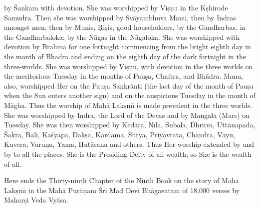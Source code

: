 by \'Sankara with devotion. She was worshipped by Vi\d{s}\d{n}u in the K\d{s}hirode Samudra. Then she was worshipped by Sv\=ayambhuva Manu, then by Indras amongst men, then by Munis, \d{R}i\d{s}is, good householders, by the Gandharbas, in the Gandharbaloka; by the N\=agas in the N\=agaloka. She was worshipped with devotion by Brahm\=a for one fortnight commencing from the bright eighth day in the month of Bh\=adra and ending on the eighth day of the dark fortnight in the three-worlds. She was worshipped by Vi\d{s}\d{n}u, with devotion in the three worlds on the meritorious Tuesday in the months of Pau\d{s}a, Chaitra, and Bh\=adra. Manu, also, worshipped Her on the Pau\d{s}a Sankr\=anti (the last day of the month of Pau\d{s}a when the Sun enters another sign) and on the auspicious Tuesday in the month of M\=agha. Thus the worship of Mah\=a Lak\d{s}m\={\i} is made prevalent in the three worlds. She was worshipped by Indra, the Lord of the Devas and by Mangala (Mars) on Tuesday. She was then worshipped by Ked\=ara, N\={\i}la, Subala, Dhruva, Utt\=anapada, \'Sakra, Bali, Ka\'syapa, Dak\d{s}a, Kardama, S\=urya, Priyavrata, Chandra, V\=ayu, Kuvera, Varu\d{n}a, Yama, Hut\=asana and others. Thus Her worship extended by and by to all the places. She is the Presiding Deity of all wealth; so She is the wealth of all.

Here ends the Thirty-ninth Chapter of the Ninth Book on the story of Mah\=a Lak\d{s}m\={\i} in the Mah\=a Pur\=a\d{n}am \'Sr\={\i} Mad Dev\={\i} Bh\=agavatam of 18,000 verses by Mahar\d{s}i Veda Vy\=asa.



